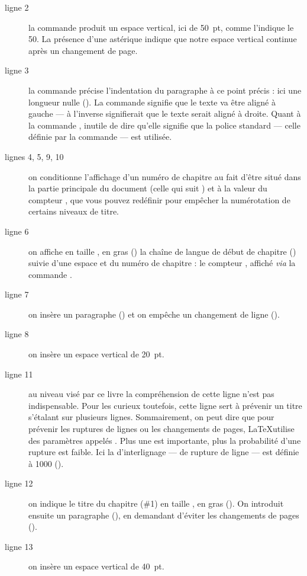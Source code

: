 \begin{description}
\item[ligne 2]la commande   produit un espace vertical, ici de 50~pt, comme l'indique le 50. La présence d'une astérique indique que notre espace vertical continue après un changement de page.
\item[ligne 3]la commande  précise l'indentation du paragraphe à ce point précis : ici une longueur nulle (). La commande  signifie que le texte va être aligné à gauche --- à l'inverse  signifierait que le texte serait aligné à droite. Quant à la commande , inutile de dire qu'elle signifie que la police standard --- celle définie par la commande  --- est utilisée.
\item[lignes 4, 5, 9, 10]on conditionne l'affichage d'un numéro de chapitre au fait d'être situé dans la partie principale du document (celle qui suit ) et à la valeur du compteur , que vous pouvez redéfinir pour empêcher la numérotation de certains niveaux de titre.
\item[ligne 6]on affiche en taille , en gras () la chaîne de langue de début de chapitre () suivie d'une espace et du numéro de chapitre : le compteur , affiché \emph{via} la commande .
\item[ligne 7]on insère un paragraphe () et on empêche un changement de ligne ().
\item[ligne 8]on insère un espace vertical de 20~pt.
\item[ligne 11]au niveau visé par ce livre la compréhension de cette ligne n'est pas indispensable. Pour les curieux toutefois, cette ligne sert à prévenir un titre s'étalant sur plusieurs lignes. Sommairement, on peut dire que pour prévenir les ruptures de lignes ou les changements de pages, \LaTeX utilise des paramètres appelés . Plus une  est importante, plus la probabilité d'une rupture est faible. Ici la  d'interlignage --- de rupture de ligne --- est définie à 1000 (). 
\item[ligne 12]on indique le titre du chapitre (\#1) en taille , en gras (). On introduit ensuite un paragraphe (), en demandant d'éviter les changements de pages ().
\item[ligne 13]on insère un espace vertical de 40~pt.
\end{description}

